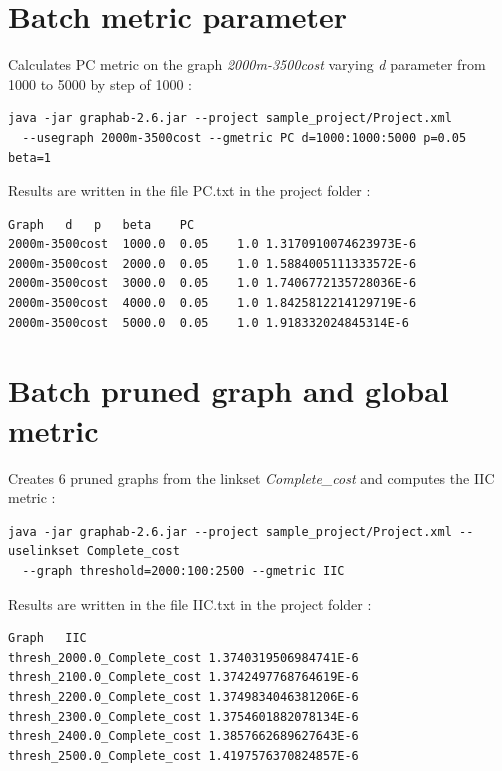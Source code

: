 \documentclass[a4paper,10pt]{report}
\begin{document}
\section{Batch metric parameter}
Calculates PC metric on the graph \textit{2000m-3500cost} varying \textit{d} parameter from 1000 to 5000 by step of 1000 :
\begin{Verbatim}
java -jar graphab-2.6.jar --project sample_project/Project.xml 
  --usegraph 2000m-3500cost --gmetric PC d=1000:1000:5000 p=0.05 beta=1
\end{Verbatim}
Results are written in the file PC.txt in the project folder :
\begin{Verbatim}
Graph	d	p	beta	PC
2000m-3500cost	1000.0	0.05	1.0	1.3170910074623973E-6
2000m-3500cost	2000.0	0.05	1.0	1.5884005111333572E-6
2000m-3500cost	3000.0	0.05	1.0	1.7406772135728036E-6
2000m-3500cost	4000.0	0.05	1.0	1.8425812214129719E-6
2000m-3500cost	5000.0	0.05	1.0	1.918332024845314E-6
\end{Verbatim}

\section{Batch pruned graph and global metric}
Creates 6 pruned graphs from the linkset \textit{Complete\_cost} and computes the IIC metric :
\begin{Verbatim}
java -jar graphab-2.6.jar --project sample_project/Project.xml --uselinkset Complete_cost
  --graph threshold=2000:100:2500 --gmetric IIC
\end{Verbatim}
Results are written in the file IIC.txt in the project folder :
\begin{Verbatim}
Graph	IIC
thresh_2000.0_Complete_cost	1.3740319506984741E-6
thresh_2100.0_Complete_cost	1.3742497768764619E-6
thresh_2200.0_Complete_cost	1.3749834046381206E-6
thresh_2300.0_Complete_cost	1.3754601882078134E-6
thresh_2400.0_Complete_cost	1.3857662689627643E-6
thresh_2500.0_Complete_cost	1.4197576370824857E-6
\end{Verbatim}
\end{document}
